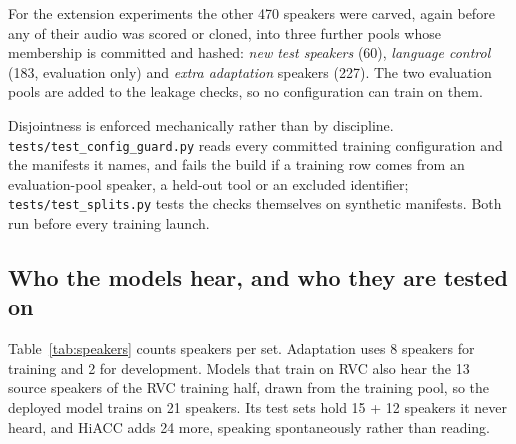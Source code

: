 For the extension experiments the other 470 speakers were carved, again before any of
their audio was scored or cloned, into three further pools whose membership is committed and hashed:
\emph{new test speakers} (60), \emph{language control} (183, evaluation only) and
\emph{extra adaptation} speakers (227). The two evaluation pools are added to the
leakage checks, so no configuration can train on them.

Disjointness is enforced mechanically rather than by discipline.
\texttt{tests/test\_config\_guard.py} reads every committed training configuration and the
manifests it names, and fails the build if a training row comes from an evaluation-pool
speaker, a held-out tool or an excluded identifier; \texttt{tests/test\_splits.py} tests
the checks themselves on synthetic manifests. Both run before every training launch.

\subsection{Who the models hear, and who they are tested on}
\label{sec:data-speakers}

Table~\ref{tab:speakers} counts speakers per set. Adaptation uses 8 speakers for
training and 2 for development. Models that train on RVC also hear the 13 source
speakers of the RVC training half, drawn from the training pool, so the deployed model
trains on 21 speakers. Its test sets hold 15 + 12 speakers it never heard, and HiACC
adds 24 more, speaking spontaneously rather than reading.

